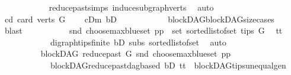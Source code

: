 \begin{isabellebody}
\ \ \ \ \ \ \ \ \ \ \isamarkupfalse%
\ reduce{\isacharunderscore}{\kern0pt}past{\isachardot}{\kern0pt}simps\ induce{\isacharunderscore}{\kern0pt}subgraph{\isacharunderscore}{\kern0pt}verts\ \isamarkupfalse%
\ auto\isanewline
\ \ \ \ \ \ \ \ \isamarkupfalse%
\ cd{}{\isacharcolon}{\kern0pt}\ {\isachardoublequoteopen}card\ {\isacharparenleft}{\kern0pt}verts\ G{\isacharparenright}{\kern0pt}\ {\isachargreater}{\kern0pt}\ {}{\isachardoublequoteclose}\ \isamarkupfalse%
\ cDm\ bD\isanewline
\ \ \ \ \ \ \ \ \ \ \isamarkupfalse%
\ blockDAG{\isachardot}{\kern0pt}blockDAG{\isacharunderscore}{\kern0pt}size{\isacharunderscore}{\kern0pt}cases\ \isamarkupfalse%
\ blast\ \isanewline
\ \ \ \ \ \ \ \ \isamarkupfalse%
\ {\isachardoublequoteopen}{\isacharparenleft}{\kern0pt}snd\ {\isacharparenleft}{\kern0pt}choose{\isacharunderscore}{\kern0pt}max{\isacharunderscore}{\kern0pt}blue{\isacharunderscore}{\kern0pt}set\ pp{\isacharparenright}{\kern0pt}{\isacharparenright}{\kern0pt}\ {\isasymin}\ set\ {\isacharparenleft}{\kern0pt}sorted{\isacharunderscore}{\kern0pt}list{\isacharunderscore}{\kern0pt}of{\isacharunderscore}{\kern0pt}set\ {\isacharparenleft}{\kern0pt}tips\ G{\isacharparenright}{\kern0pt}{\isacharparenright}{\kern0pt}{\isachardoublequoteclose}\ \isamarkupfalse%
\ tt{}\isanewline
\ \ \ \ \ \ \ \ \ \ \ \ digraph{\isachardot}{\kern0pt}tips{\isacharunderscore}{\kern0pt}finite\ bD\ subs\ sorted{\isacharunderscore}{\kern0pt}list{\isacharunderscore}{\kern0pt}of{\isacharunderscore}{\kern0pt}set{\isacharparenleft}{\kern0pt}{}{\isacharparenright}{\kern0pt}\ \isamarkupfalse%
\ auto\isanewline
\ \ \ \ \ \ \ \ \isamarkupfalse%
\ \isanewline
\ \ \ \ \ \ \ \ \isamarkupfalse%
\ {\isachardoublequoteopen}blockDAG\ {\isacharparenleft}{\kern0pt}reduce{\isacharunderscore}{\kern0pt}past\ G\ {\isacharparenleft}{\kern0pt}snd\ {\isacharparenleft}{\kern0pt}choose{\isacharunderscore}{\kern0pt}max{\isacharunderscore}{\kern0pt}blue{\isacharunderscore}{\kern0pt}set\ pp{\isacharparenright}{\kern0pt}{\isacharparenright}{\kern0pt}{\isacharparenright}{\kern0pt}{\isachardoublequoteclose}\ \isamarkupfalse%
\ \isanewline
\ \ \ \ \ \ \ \ \ \ \ \ blockDAG{\isachardot}{\kern0pt}reduce{\isacharunderscore}{\kern0pt}past{\isacharunderscore}{\kern0pt}dagbased\ bD\ tt{}\ \ blockDAG{\isachardot}{\kern0pt}tips{\isacharunderscore}{\kern0pt}unequal{\isacharunderscore}{\kern0pt}gen\ \isanewline

\end{isabellebody}
